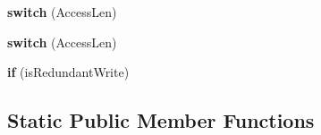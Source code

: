 \begin{DoxyCompactItemize}
\item 
\hypertarget{structRedSpyAnalysis_a4ea5909f3cc16bc7dbe08fc85a9d0576}{{\bfseries switch} (Access\-Len)}\label{structRedSpyAnalysis_a4ea5909f3cc16bc7dbe08fc85a9d0576}

\item 
\hypertarget{structRedSpyAnalysis_a4ea5909f3cc16bc7dbe08fc85a9d0576}{{\bfseries switch} (Access\-Len)}\label{structRedSpyAnalysis_a4ea5909f3cc16bc7dbe08fc85a9d0576}

\item 
\hypertarget{structRedSpyAnalysis_a629b6a8fb4e354e0b7c1acd2acb66598}{{\bfseries if} (is\-Redundant\-Write)}\label{structRedSpyAnalysis_a629b6a8fb4e354e0b7c1acd2acb66598}

\end{DoxyCompactItemize}
\subsection*{Static Public Member Functions}
